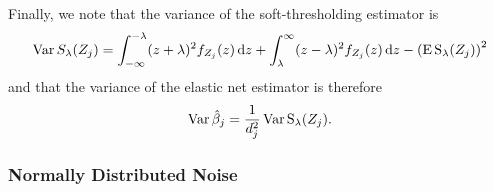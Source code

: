 Finally, we note that the variance of the soft-thresholding estimator is
\begin{equation}
  \label{eq:st-variance}
  \operatorname{Var} {S_\lambda({Z_j})} = \int_{-\infty}^{-\lambda}(z + \lambda)^2f_{Z_j}(z) \mathop{}\!\mathrm{d} z + \int_{\lambda}^\infty (z - \lambda)^2 f_{Z_j}(z) \mathop{}\!\mathrm{d} z - \left(\operatorname{E} \operatorname{S}_\lambda({Z_j})\right)^2
\end{equation}
and that the variance of the elastic net estimator is therefore
\begin{equation*}
  \operatorname{Var} \hat\beta_j = \frac{1}{d_j^2} \operatorname{Var} \operatorname{S}_\lambda({Z_j}).
\end{equation*}


\subsubsection{Normally Distributed Noise}%
\label{sec:normally-distributed-noise}

